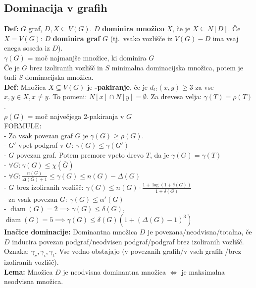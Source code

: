 \documentclass[a4paper,10pt]{article}
\theoremstyle{definition}
\DeclareMathOperator{\diam}{diam}
\let\oldtextbf\textbf
\renewcommand{\textbf}[1]{\oldtextbf{\boldmath #1}}
\begin{document}
\subsection*{Dominacija v grafih}
\textbf{Def:} $G$ graf, $D, X \subseteq V(G)$. $D$ \textbf{dominira množico} $X$, če je $X \subseteq N[D]$. Če $X = V(G)$: $D$ \textbf{dominira graf} $G$ (tj.\ vsako vozlišče iz $V(G) - D$ ima vsaj enega soseda iz $D$).\\
\textbf{$\gamma(G)$} = moč najmanjše množice, ki dominira $G$\\
Če je $G$ brez izoliranih vozlišč in $S$ minimalna dominacijska množica, potem je tudi $\overline{S}$ dominacijska množica.\\
\textbf{Def:} Množica $X \subseteq V(G)$ je \textbf{2-pakiranje}, če je $d_G(x, y) \geq 3$ za vse $x, y \in X, x \neq y$. To pomeni: $N[x] \cap N[y] = \emptyset$. Za drevesa velja: $\gamma(T) = \rho(T)$.\\
\textbf{$\rho(G)$} = moč največjega 2-pakiranja v $G$\\
FORMULE:\\
- Za vsak povezan graf $G$ je $\gamma(G) \geq \rho(G)$.\\
- $G'$ vpet podgraf v $G$: $\gamma(G) \leq \gamma(G')$\\
- $G$ povezan graf. Potem premore vpeto drevo $T$, da je $\gamma(G) = \gamma(T)$\\
- $\forall G\colon \gamma(G) \leq \chi(\overline{G})$\\
- $\forall G\colon \frac{n(G)}{\Delta(G) + 1} \leq \gamma(G) \leq n(G) - \Delta(G)$\\
- $G$ brez izoliranih vozlišč: $\gamma(G) \leq n(G) \cdot \frac{1 + \log(1 + \delta(G))}{1 + \delta(G)}$\\
- za vsak povezan $G$: $\gamma(G) \leq \alpha'(G)$\\
- $\diam(G) = 2 \implies \gamma(G) \leq \delta(G)$, $\diam(G) = 5 \implies \gamma(G) \leq \delta(G) (1 + (\Delta(G) - 1)^3)$\\
\textbf{Inačice dominacije:} Dominantna množica $D$ je povezana/neodvisna/totalna, če $D$ inducira povezan podgraf/neodvisen podgraf/podgraf brez izoliranih vozlišč. Oznaka: $\gamma_c, \gamma_i, \gamma_t$. Vse vedno obstajajo (v povezanih grafih/v vseh grafih /brez izoliranih vozlišč).\\
\textbf{Lema:} Množica $D$ je neodvisna dominantna množica $\iff$ je maksimalna neodvisna množica.\\
\end{document}
